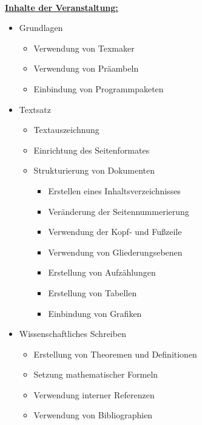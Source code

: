 \documentclass[12pt]{article}
\newif\ifmore\moretrue
\begin{document}
~\\
\noindent
{\fontsize{20}{0} \selectfont \textbf{\underline{Inhalte der Veranstaltung:}}}\\
\begin{itemize}
\item {\large Grundlagen}
\begin{itemize}
\item Verwendung von Texmaker
\item Verwendung von Präambeln
\item Einbindung von Programmpaketen

\end{itemize}
\item {\large Textsatz}
	\begin{itemize}
	\item Textauszeichnung
	\item Einrichtung des Seitenformates
	\item Strukturierung von Dokumenten
		\begin{itemize}
		\item Erstellen eines Inhaltsverzeichnisses
		\item Veränderung der Seitennummerierung
		\item Verwendung der Kopf- und Fußzeile
		\item Verwendung von Gliederungsebenen 
		\item Erstellung von Aufzählungen
		\item Erstellung von Tabellen
		\item Einbindung von Grafiken
		\end{itemize}
	\end{itemize}
	
\item{\large Wissenschaftliches Schreiben}
\begin{itemize}
	\item {Erstellung von Theoremen und Definitionen}
	\item {Setzung mathematischer Formeln}
	\item {Verwendung interner Referenzen}
	\item {Verwendung von Bibliographien}
\end{itemize}
\end{itemize}

\newpage
\setcounter{page}{1}

\fi\ifmore\repeat\closein\quelle
 
\end{document}
